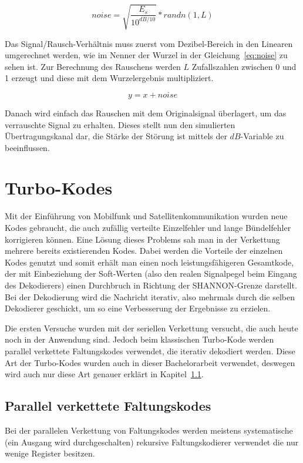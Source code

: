\begin{equation}
noise = \sqrt{\frac{E_s}{10^{dB/10}}} * randn(1,L)
\label{eq:noise}
\end{equation}

Das Signal/Rausch-Verhältnis muss zuerst vom Dezibel-Bereich in den Linearen umgerechnet werden, wie im Nenner der Wurzel in der Gleichung~\ref{eq:noise} zu sehen ist.
Zur Berechnung des Rauschens werden $L$ Zufallszahlen zwischen 0 und 1 erzeugt und diese mit dem Wurzelergebnis multipliziert. 

\begin{equation}
y = x + noise
\label{eq:noisySignal}
\end{equation}

Danach wird einfach das Rauschen mit dem Originalsignal überlagert, um das verrauschte Signal zu erhalten. Dieses stellt nun den simulierten Übertragungskanal dar, die Stärke der Störung ist mittels der $dB$-Variable zu beeinflussen. \cite{AWGN}

\section{Turbo-Kodes}
\label{sec:turboCodes}
Mit der Einführung von Mobilfunk und Satellitenkommunikation wurden neue Kodes gebraucht, die auch zufällig verteilte Einzelfehler und lange Bündelfehler korrigieren können. Eine Lösung dieses Problems sah man in der Verkettung mehrere bereits existierenden Kodes. Dabei werden die Vorteile der einzelnen Kodes genutzt und somit erhält man einen noch leistungsfähigeren Gesamtkode, der mit Einbeziehung der Soft-Werten (also den realen Signalpegel beim Eingang des Dekodierers) einen Durchbruch in Richtung der SHANNON-Grenze darstellt. Bei der Dekodierung wird die Nachricht iterativ, also mehrmals durch die selben Dekodierer geschickt, um so eine Verbesserung der Ergebnisse zu erzielen. \cite[242 f.]{schoenfeld2012informations}

Die ersten Versuche wurden mit der seriellen Verkettung versucht, die auch heute noch in der Anwendung sind. Jedoch beim klassischen Turbo-Kode werden parallel verkettete Faltungskodes verwendet, die iterativ dekodiert werden. Diese Art der Turbo-Kodes wurden auch in dieser Bachelorarbeit verwendet, deswegen wird auch nur diese Art genauer erklärt in Kapitel~\ref{sec:parallelConvCodes}.

\subsection{Parallel verkettete Faltungskodes} 
\label{sec:parallelConvCodes}
Bei der parallelen Verkettung von Faltungskodes werden meistens systematische (ein Ausgang wird durchgeschalten) rekursive Faltungskodierer verwendet die nur wenige Register besitzen.


